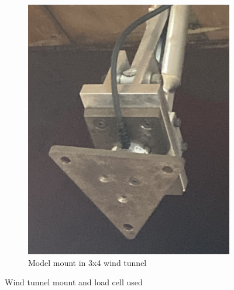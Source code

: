 \begin{figure}[H]
\begin{subfigure}[b]{0.45\textwidth}
                \includegraphics[scale=0.07]{04_Methodology/Figs/mount}
                \caption{Model mount in 3x4 wind tunnel}
                \label{fig:LoadCellb}
     \end{subfigure}
     \caption{Wind tunnel mount and load cell used}
     \label{fig:loadMount}

\end{figure}



    
